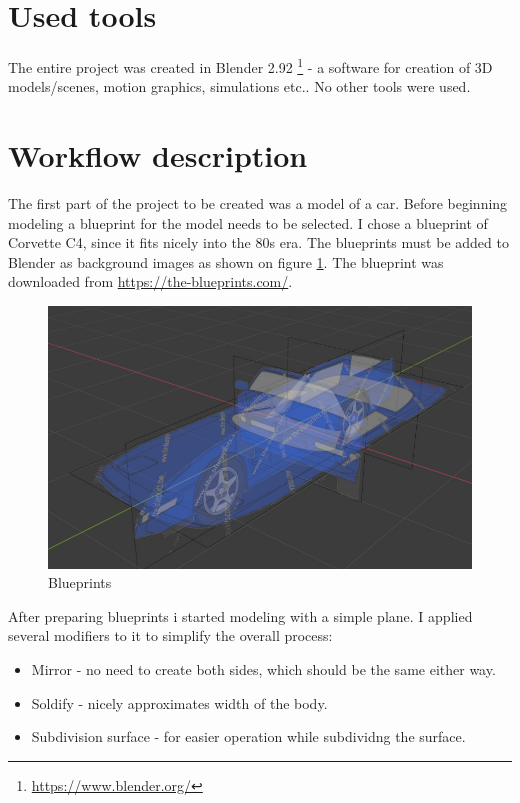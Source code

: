 \documentclass[12pt,a4paper,titlepage,final]{report}
\begin{document}
\section{Used tools}
The entire project was created in Blender 2.92 \footnote{\url{https://www.blender.org/}} - a software for creation of 3D models/scenes, motion graphics, simulations etc.. No other tools were used.

\section{Workflow description}
The first part of the project to be created was a model of a car. Before beginning modeling a blueprint for the model needs to be selected. I chose a blueprint of Corvette C4, since it fits nicely into the 80s era. The blueprints must be added to Blender as background images as shown on figure \ref{fig:blueprints}. The blueprint was downloaded from \url{https://the-blueprints.com/}.

\begin{figure}[H]
    \centering
    \includegraphics{images/blueprints.jpg}
    \caption{Blueprints}
    \label{fig:blueprints}
\end{figure}

After preparing blueprints i started modeling with a simple plane. I applied several modifiers to it to simplify the overall process:
\begin{itemize}
    \item Mirror - no need to create both sides, which should be the same either way.
    \item Soldify - nicely approximates width of the body.
    \item Subdivision surface - for easier operation while subdividng the surface.
\end{itemize}
\end{document}

